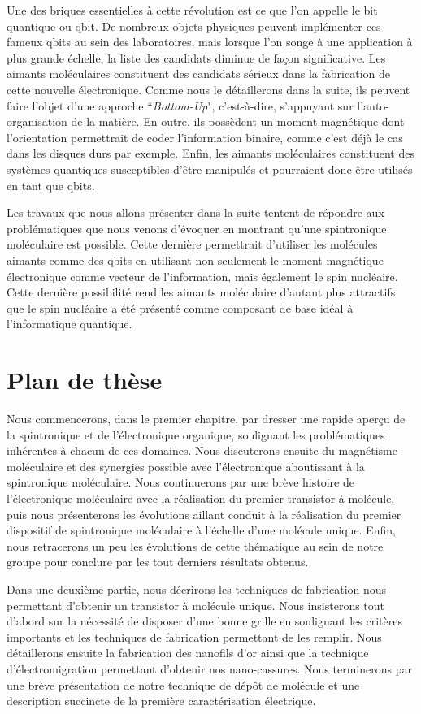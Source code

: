 Une des briques essentielles à cette révolution est  ce que l'on appelle le bit quantique ou qbit. De nombreux objets physiques peuvent implémenter ces fameux qbits au sein des laboratoires, mais lorsque l'on songe à une application à plus grande échelle, la liste des candidats diminue de façon significative. Les aimants moléculaires constituent des candidats sérieux dans la fabrication de cette nouvelle électronique. Comme nous le détaillerons dans la suite, ils peuvent faire l'objet d'une approche ``\textit{Bottom-Up}", c'est-à-dire, s'appuyant sur l'auto-organisation de la matière. En outre, ils possèdent un moment magnétique dont l'orientation permettrait de coder l'information binaire, comme c'est déjà le cas dans les disques durs par exemple. Enfin, les aimants moléculaires constituent des systèmes quantiques susceptibles d'\^etre manipulés et pourraient donc \^etre utilisés en tant que qbits.


Les travaux que nous allons présenter dans la suite tentent de répondre aux problématiques que nous venons d'évoquer en montrant qu'une spintronique moléculaire est possible. Cette dernière permettrait d'utiliser les molécules aimants comme des qbits en utilisant non seulement le moment magnétique électronique comme vecteur de l'information, mais également le spin nucléaire. Cette dernière possibilité rend les aimants moléculaire d'autant plus attractifs que le spin nucléaire a été présenté comme composant de base idéal à l'informatique quantique.

\section*{Plan de thèse}

Nous commencerons, dans le premier chapitre, par dresser une rapide aperçu de la spintronique et de l'électronique organique, soulignant les problématiques inhérentes à  chacun de ces domaines. Nous discuterons ensuite du magnétisme moléculaire et des synergies possible avec l'électronique aboutissant à la spintronique moléculaire. Nous continuerons par une brève histoire de l'électronique moléculaire avec la réalisation du premier transistor à molécule, puis nous présenterons les évolutions aillant conduit à la réalisation du premier dispositif de spintronique moléculaire à l'échelle d'une molécule unique. Enfin, nous retracerons un peu les évolutions de cette thématique au sein de notre groupe pour conclure par les tout derniers résultats obtenus.

Dans une deuxième partie, nous décrirons les techniques de fabrication nous permettant d'obtenir un transistor à molécule unique. Nous insisterons tout d'abord sur la nécessité de disposer d'une bonne grille en soulignant les critères importants et les techniques de fabrication permettant de les remplir. Nous détaillerons ensuite la fabrication des nanofils d'or ainsi que la technique d'électromigration permettant d'obtenir nos nano-cassures. Nous terminerons par une brève présentation de notre technique de dépôt de molécule et une description succincte de la première caractérisation électrique.

